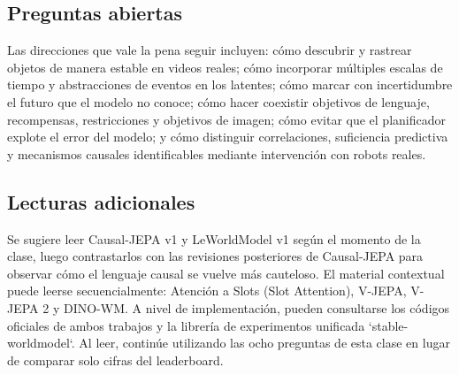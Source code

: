 \subsection{Preguntas abiertas}

Las direcciones que vale la pena seguir incluyen: cómo descubrir y rastrear objetos de manera estable en videos reales; cómo incorporar múltiples escalas de tiempo y abstracciones de eventos en los latentes; cómo marcar con incertidumbre el futuro que el modelo no conoce; cómo hacer coexistir objetivos de lenguaje, recompensas, restricciones y objetivos de imagen; cómo evitar que el planificador explote el error del modelo; y cómo distinguir correlaciones, suficiencia predictiva y mecanismos causales identificables mediante intervención con robots reales.

\subsection{Lecturas adicionales}

Se sugiere leer Causal-JEPA v1 y LeWorldModel v1 según el momento de la clase, luego contrastarlos con las revisiones posteriores de Causal-JEPA para observar cómo el lenguaje causal se vuelve más cauteloso. El material contextual puede leerse secuencialmente: Atención a Slots (Slot Attention), V-JEPA, V-JEPA 2 y DINO-WM. A nivel de implementación, pueden consultarse los códigos oficiales de ambos trabajos y la librería de experimentos unificada `stable-worldmodel`. Al leer, continúe utilizando las ocho preguntas de esta clase en lugar de comparar solo cifras del leaderboard.


